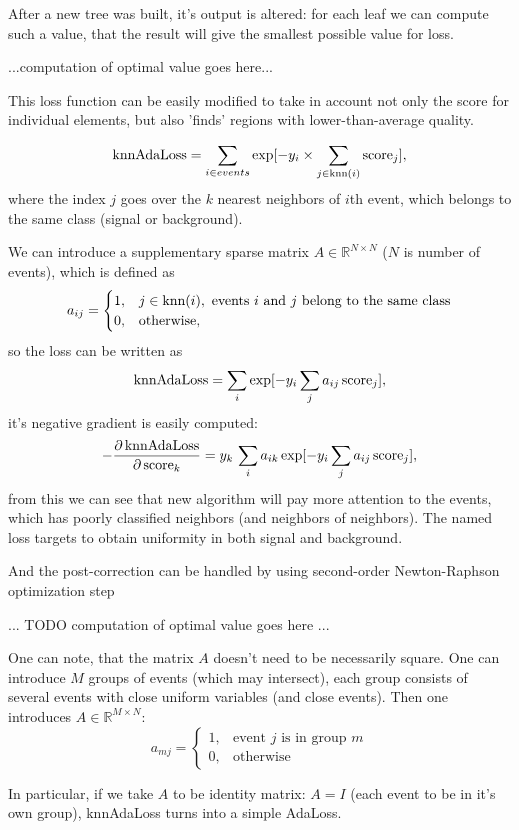 \documentclass[12pt]{article}
\theoremstyle{definition}
\theoremstyle{remark}
\def\RR{\mathbb{R}}
\begin{document}
After a new tree was built, it's output is altered: for each leaf we can compute such a value, that the result will give the smallest possible value for loss.

...computation of optimal value goes here...

This loss function can be easily modified to take in account not only the score for individual elements, but also 'finds' regions with lower-than-average quality.

\[
	\text{knnAdaLoss} = \sum_{i \in events} \exp[-y_i \times \sum_{j \in \text{knn}(i)} \text{score}_j],
\]
where the index $j$ goes over the $k$ nearest neighbors of $i$th event, which belongs to the same class (signal or background).

We can introduce a supplementary sparse matrix $A \in \RR^{N \times N}$ ($N$ is number of events), which is defined as 
\[
a_{ij} = \begin{cases} 
1, & j \in \text{knn}(i), \text{ events $i$ and $j$ belong to the same class} \\
0, & \text{otherwise},
\end{cases}
\] so the loss can be written as
\[
	\text{knnAdaLoss} = \sum_i \exp [- y_i \sum_j a_{ij} \, \text{score}_j ],
\]
it's negative gradient is easily computed:
\[
	-\dfrac{\partial \, \text{knnAdaLoss}} {\partial \, \text{score}_k} = 
	 y_k \, \sum_i a_{ik} \exp [- y_i \sum_j a_{ij} \, \text{score}_j ],
\]
from this we can see that new algorithm will pay more attention to the events, which has poorly classified neighbors (and neighbors of neighbors). The named loss targets to obtain uniformity in both signal and background.

And the post-correction can be handled by using second-order Newton-Raphson optimization step 

... TODO computation of optimal value goes here ...

One can note, that the matrix $A$ doesn't need to be necessarily square. One can introduce $M$ groups of events (which may intersect), each group consists of several events with close uniform variables (and close events). Then one introduces $A \in \RR^{M \times N}$:
\[
	a_{mj} = \begin{cases}
		1, & \text{event $j$ is in group $m$} \\
		0, & \text{otherwise}
	\end{cases}
\]

In particular, if we take $A$ to be identity matrix: $A = I$ (each event to be in it's own group), knnAdaLoss turns into a simple AdaLoss.
\end{document}
